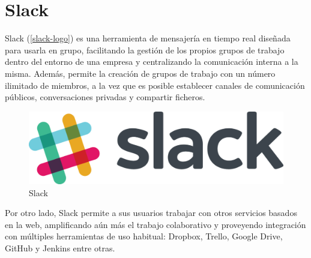 \section{Slack}

Slack (\autoref{slack-logo}) es una herramienta de mensajería en tiempo real diseñada para usarla en grupo, facilitando la gestión de los propios grupos de trabajo dentro del entorno de una empresa y centralizando la comunicación interna a la misma\cite{santamaria2015}. Además, permite la creación de grupos de trabajo con un número ilimitado de miembros, a la vez que es posible establecer canales de comunicación públicos, conversaciones privadas y compartir ficheros.

\begin{figure}[htbp]
	\centering
	\includegraphics[width=0.80\linewidth]
	{entorno/figuras/Slack.png}
	\caption{Slack}
	\label{slack-logo}
\end{figure}

Por otro lado, Slack permite a sus usuarios trabajar con otros servicios basados en la web, amplificando aún más el trabajo colaborativo y proveyendo integración con múltiples herramientas de uso habitual: Dropbox, Trello, Google Drive, GitHub y Jenkins entre otras.

\endinput